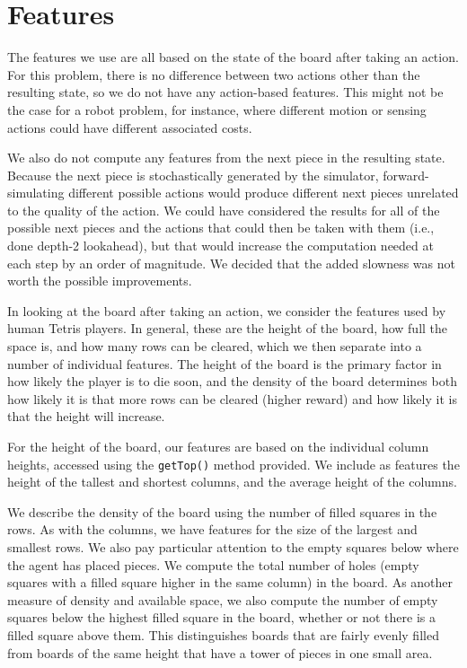 \documentclass[11pt]{article}
\begin{document}
\section{Features}

The features we use are all based on the state of the board after taking an action.  For this problem, there is no difference between two actions other than the resulting state, so we do not have any action-based features.  This might not be the case for a robot problem, for instance, where different motion or sensing actions could have different associated costs.

We also do not compute any features from the next piece in the resulting state.  Because the next piece is stochastically generated by the simulator, forward-simulating different possible actions would produce different next pieces unrelated to the quality of the action.  We could have considered the results for all of the possible next pieces and the actions that could then be taken with them (i.e., done depth-2 lookahead), but that would increase the computation needed at each step by an order of magnitude.  We decided that the added slowness was not worth the possible improvements.

In looking at the board after taking an action, we consider the features used by human Tetris players.  In general, these are the height of the board, how full the space is, and how many rows can be cleared, which we then separate into a number of individual features.  The height of the board is the primary factor in how likely the player is to die soon, and the density of the board determines both how likely it is that more rows can be cleared (higher reward) and how likely it is that the height will increase.

For the height of the board, our features are based on the individual column heights, accessed using the \texttt{getTop()} method provided.  We include as features the height of the tallest and shortest columns, and the average height of the columns.

We describe the density of the board using the number of filled squares in the rows.  As with the columns, we have features for the size of the largest and smallest rows.  We also pay particular attention to the empty squares below where the agent has placed pieces.  We compute the total number of holes (empty squares with a filled square higher in the same column) in the board.  As another measure of density and available space, we also compute the number of empty squares below the highest filled square in the board, whether or not there is a filled square above them.  This distinguishes boards that are fairly evenly filled from boards of the same height that have a tower of pieces in one small area.
\end{document}

